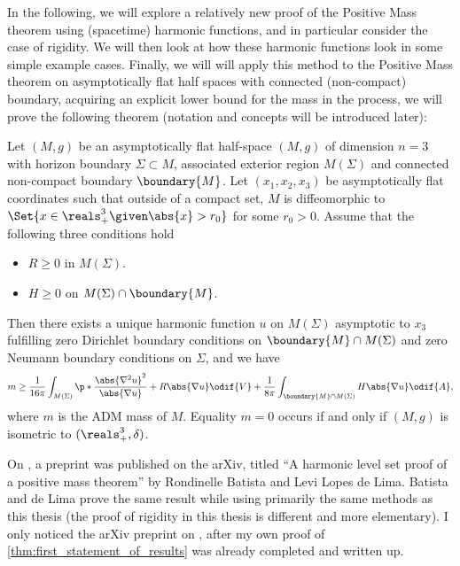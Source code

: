 \documentclass[titlepage,numbers=noenddot,headinclude,oneside,%
footinclude=true,cleardoublepage=empty,%
BCOR=5mm,paper=a4,fontsize=11pt,%
english,%
]{scrartcl}
\begin{document}
In the following, we will explore a relatively new proof of the Positive Mass theorem using (spacetime) harmonic functions, and in particular consider the case of rigidity. We will then look at how these harmonic functions look in some simple example cases. Finally, we will will apply this method to the Positive Mass theorem on asymptotically flat half spaces with connected (non-compact) boundary, acquiring an explicit lower bound for the mass in the process, \ie we will prove the following theorem (notation and concepts will be introduced later):

\begin{theorem}\label{thm:first_statement_of_results}
    Let \( (M,g) \) be an asymptotically flat half-space \( (M,g) \) of dimension \( n=3 \) with horizon boundary \( \Sigma\subset M \), associated exterior region \( M(\Sigma) \) and connected non-compact boundary \( \boundary{M} \). Let \( (x_1,x_2,x_3) \) be asymptotically flat coordinates such that outside of a compact set, \( M \) is diffeomorphic to \( \Set{x\in \reals^3_+\given \abs{x}>r_0} \) for some \( r_0>0 \). Assume that the following three conditions hold
    \begin{itemize}
        \item \( R\geq 0 \) in \( M(\Sigma) \).
        \item \( H \geq 0 \) on \( M(\Sigma)\cap \boundary{M} \).
    \end{itemize}
    Then there exists a unique harmonic function \( u \) on \( M(\Sigma) \) asymptotic to \( x_3 \) fulfilling zero Dirichlet boundary conditions on \( \boundary{M}\cap M(\Sigma) \) and zero Neumann boundary conditions on \( \Sigma \), and we have
    \begin{equation*}
        m\geq \frac{1}{16\pi}\int_{M(\Sigma)}\p*{\frac{\abs{\nabla^2 u}^2}{\abs{\nabla u}}+R\abs{\nabla u}}\odif{V}+\frac{1}{8\pi}\int_{\boundary{M}\cap M(\Sigma)}H\abs{\nabla u}\odif{A},
    \end{equation*}
    where \( m \) is the ADM mass of \( M \). Equality \( m=0 \) occurs if and only if \( (M,g) \) is isometric to \( (\reals^3_+,\delta) \). 
\end{theorem}

On , a preprint \cite{batistaHarmonicLevelSet2023} was published on the arXiv, titled \enquote{A harmonic level set proof of a positive mass theorem} by Rondinelle Batista and Levi Lopes de Lima. Batista and de Lima prove the same result while using primarily the same methods as this thesis (the proof of rigidity in this thesis is different and more elementary). I only noticed the arXiv preprint on , after my own proof of \cref{thm:first_statement_of_results} was already completed and written up.
\end{document}
